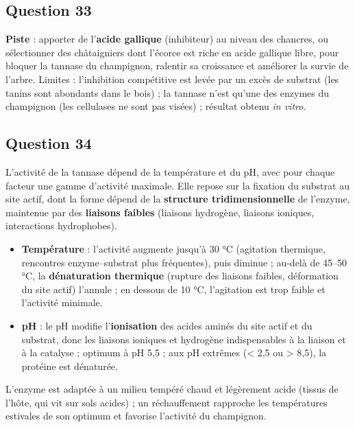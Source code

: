 \documentclass[11pt,a4paper]{article}
\providecommand{\tightlist}{\setlength{\itemsep}{0pt}\setlength{\parskip}{0pt}}
\begin{document}
\hypertarget{question-33}{%
\subsection{Question 33}\label{question-33}}

\textbf{Piste} : apporter de l'\textbf{acide gallique} (inhibiteur) au niveau des chancres, ou sélectionner des châtaigniers dont l'écorce est riche en acide gallique libre, pour bloquer la tannase du champignon, ralentir sa croissance et améliorer la survie de l'arbre. Limites : l'inhibition compétitive est levée par un excès de substrat (les tanins sont abondants dans le bois) ; la tannase n'est qu'une des enzymes du champignon (les cellulases ne sont pas visées) ; résultat obtenu \emph{in vitro}.

\hypertarget{question-34}{%
\subsection{Question 34}\label{question-34}}

L'activité de la tannase dépend de la température et du pH, avec pour chaque facteur une gamme d'activité maximale. Elle repose sur la fixation du substrat au site actif, dont la forme dépend de la \textbf{structure tridimensionnelle} de l'enzyme, maintenue par des \textbf{liaisons faibles} (liaisons hydrogène, liaisons ioniques, interactions hydrophobes).

\begin{itemize}
\tightlist
\item
  \textbf{Température} : l'activité augmente jusqu'à 30 °C (agitation thermique, rencontres enzyme--substrat plus fréquentes), puis diminue ; au-delà de 45--50 °C, la \textbf{dénaturation thermique} (rupture des liaisons faibles, déformation du site actif) l'annule ; en dessous de 10 °C, l'agitation est trop faible et l'activité minimale.
\item
  \textbf{pH} : le pH modifie l'\textbf{ionisation} des acides aminés du site actif et du substrat, donc les liaisons ioniques et hydrogène indispensables à la liaison et à la catalyse ; optimum à pH 5,5 ; aux pH extrêmes (\textless{} 2,5 ou \textgreater{} 8,5), la protéine est dénaturée.
\end{itemize}

L'enzyme est adaptée à un milieu tempéré chaud et légèrement acide (tissus de l'hôte, qui vit sur sols acides) ; un réchauffement rapproche les températures estivales de son optimum et favorise l'activité du champignon.
\end{document}
